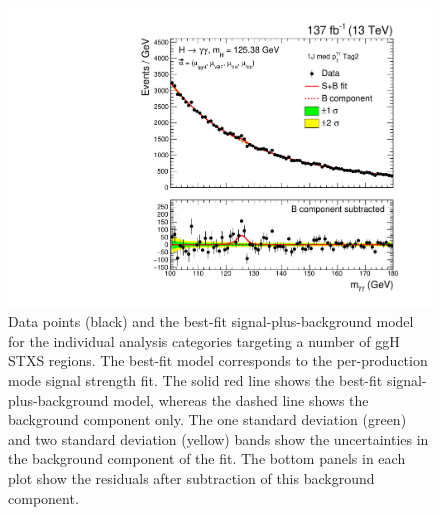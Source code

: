 \begin{figure}[htbp]
  \includegraphics[width=.32\linewidth]{Figures/app_sb_models/RECO_1J_PTH_60_120_Tag2_CMS_hgg_mass.pdf}
  \caption[Observed diphoton mass distributions: ggH 0J and ggH 1J]
  {
    Data points (black) and the best-fit signal-plus-background model for the individual analysis categories targeting a number of ggH STXS regions. The best-fit model corresponds to the per-production mode signal strength fit. The solid red line shows the best-fit signal-plus-background model, whereas the dashed line shows the background component only. The one standard deviation (green) and two standard deviation (yellow) bands show the uncertainties in the background component of the fit. The bottom panels in each plot show the residuals after subtraction of this background component.
  }
  \label{fig:diphoton_mass_0}
\end{figure}

